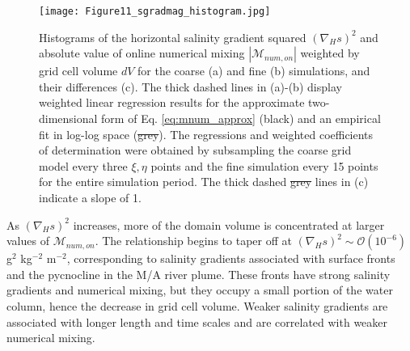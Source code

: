 \documentclass[draft]{agujournal2019}
\providecommand{\DIFadd}[1]{{\protect\color{blue}\uwave{#1}}} %
\providecommand{\DIFdel}[1]{{\protect\color{red}\sout{#1}}}                      %
\providecommand{\DIFaddFL}[1]{\DIFadd{#1}} %
\providecommand{\DIFdelFL}[1]{\DIFdel{#1}} %
\providecommand{\DIFaddbeginFL}{} %
\providecommand{\DIFaddendFL}{} %
\providecommand{\DIFdelbeginFL}{} %
\providecommand{\DIFdelendFL}{} %
\begin{document}
\begin{figure}[ht!]
 \centerline{\texttt{[image: Figure11\_sgradmag\_histogram.jpg]}}
  \caption{Histograms of the horizontal salinity gradient squared $(\nabla_H s)^2$ and absolute value of online numerical mixing $|\mathcal{M}_{num, on}|$ weighted by grid cell volume $dV$ for the coarse (a) and fine (b) simulations, and their differences (c). The thick dashed lines in (a)-(b) display weighted linear regression results for the approximate two-dimensional form of Eq. \ref{eq:mnum_approx} (black) and an empirical fit in log-log space (\DIFdelbeginFL \DIFdelFL{grey}\DIFdelendFL \DIFaddbeginFL \DIFaddFL{gray}\DIFaddendFL ). The regressions and weighted coefficients of determination were obtained by subsampling the coarse grid model every three $\xi,\eta$ points and the fine simulation every 15 points for the entire simulation period. The thick dashed \DIFdelbeginFL \DIFdelFL{grey }\DIFdelendFL \DIFaddbeginFL \DIFaddFL{gray }\DIFaddendFL lines in (c) indicate a slope of 1.}
  \label{fig:mnum_sgrad}
\end{figure}

As $(\nabla_H s)^2$ increases, more of the domain volume is concentrated at larger values of $\mathcal{M}_{num, on}$. The relationship begins to taper off at $(\nabla_H s)^2 \sim \mathcal{O}(10^{-6})$ g$^2$ kg$^{-2}$ m$^{-2}$, corresponding to salinity gradients associated with surface fronts and the pycnocline in the M/A river plume. These fronts have strong salinity gradients and numerical mixing, but they occupy a small portion of the water column, hence the decrease in grid cell volume. Weaker salinity gradients are associated with longer length and time scales and are correlated with weaker numerical mixing. 
\end{document}

